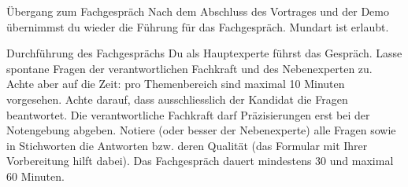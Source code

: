 \begin{taskitemwithoutcomment}{Übergang zum Fachgespräch}
  Nach dem Abschluss des Vortrages und der Demo übernimmst du wieder die Führung für das Fachgespräch. Mundart ist erlaubt.
\end{taskitemwithoutcomment}
\begin{taskitemwithoutcomment}{Durchführung des Fachgesprächs}
  Du als Hauptexperte führst das Gespräch. Lasse spontane Fragen der verantwortlichen Fachkraft und des Nebenexperten zu. Achte aber auf die Zeit: pro Themenbereich sind maximal 10 Minuten vorgesehen. Achte darauf, dass ausschliesslich der Kandidat die Fragen beantwortet. Die verantwortliche Fachkraft darf Präzisierungen erst bei der Notengebung abgeben. Notiere (oder besser der Nebenexperte) alle Fragen sowie in Stichworten die Antworten bzw. deren Qualität (das Formular mit Ihrer Vorbereitung hilft dabei). Das Fachgespräch dauert mindestens 30 und maximal 60 Minuten.
\end{taskitemwithoutcomment}
